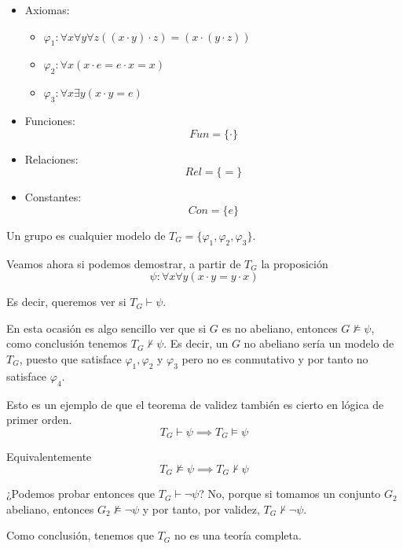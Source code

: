 \begin{example}\mbox{}

\begin{itemize}

	\item Axiomas:
	\begin{itemize}
		\vspace{-3mm}
		\item $\varphi_1: \forall x\forall y\forall z ((x\cdot y)\cdot z) = (x\cdot(y\cdot z))$
		\item $\varphi_2: \forall x(x\cdot e = e\cdot x = x)$
		\item $\varphi_3: \forall x\exists y (x\cdot y = e)$
	\end{itemize}

	\item Funciones:
	$$Fun = \{\cdot\}$$

	\item Relaciones:
	$$Rel = \{=\}$$

	\item Constantes:
	$$Con = \{e\}$$
\end{itemize}

Un grupo es cualquier modelo de $T_G = \{\varphi_1, \varphi_2, \varphi_3\}$.

Veamos ahora si podemos demostrar, a partir de $T_G$ la proposición
\[\psi: \forall x\forall y(x\cdot y = y\cdot x)\]

Es decir, queremos ver si $T_G\vdash \psi$.

En esta ocasión es algo sencillo ver que si $G$ es no abeliano, entonces $G\nvDash \psi$, como conclusión tenemos $T_G\nvdash \psi$. Es decir, un $G$ no abeliano sería un modelo de $T_G$, puesto que satisface $\varphi_1, \varphi_2$ y $\varphi_3$ pero no es conmutativo y por tanto no satisface $\varphi_4$.

Esto es un ejemplo de que el teorema de validez también es cierto en lógica de primer orden.
$$T_G\vdash \psi \implies T_G \vDash \psi$$

Equivalentemente
$$T_G\nvDash \psi \implies T_G \nvdash \psi$$

¿Podemos probar entonces que $T_G\vdash \neg \psi$? No, porque si tomamos un conjunto $G_2$ abeliano, entonces $G_2\nvDash \neg\psi$ y por tanto, por validez, $T_G\nvdash \neg \psi$.

Como conclusión, tenemos que $T_G$ no es una teoría completa.
\end{example}

